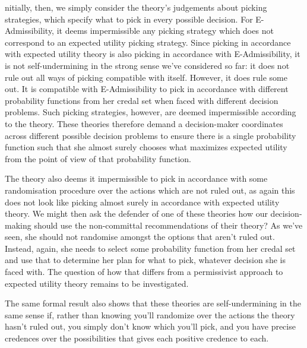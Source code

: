 \documentclass[a4paper]{article}
\renewcommand{\color}[1]{}
\newenvironment{colored}[1]{\leavevmode\color{#1}}{}
\newenvironment{CCM rewritten}
{\begingroup\color{blue}} %
{\endgroup}              %
\begin{document}
\begin{colored}
	Initially, then, we simply consider the theory's judgements about picking strategies, which specify what to pick in every possible decision. 
	For E-Admissibility, it deems impermissible any picking strategy which does not correspond to an expected utility picking strategy. Since picking in accordance with expected utility theory is also picking in accordance with E-Admissibility, it is not self-undermining in the strong sense we've considered so far: it does not rule out all ways of picking compatible with itself. However, it does rule some out.
	 It is compatible with E-Admissibility to pick in accordance with different probability functions from her credal set when faced with different decision problems. 
	 Such picking strategies, however, are deemed impermissible according to the theory.
	 These theories therefore demand a decision-maker coordinates across different possible decision problems to ensure there is a single probability function such that she almost surely chooses what maximizes expected utility from the point of view of that probability function.
	 
	 The theory also deems it impermissible to pick in accordance with some randomisation procedure over the actions which are not ruled out,
	 as again this does not look like picking almost surely in accordance with expected utility theory. 
	 We might then ask the defender of one of these theories how our decision-making should use the non-committal recommendations of their theory? As we've seen, she should not randomise amongst the options that aren't ruled out. Instead, again, she needs to select some probability function from her credal set and use that to determine her plan for what to pick, whatever decision she is faced with. 
	 The question of how that differs from a permissivist approach to expected utility theory remains to be investigated. 
	 
	 The same formal result also shows that these theories are self-undermining in the same sense if, rather than knowing you'll randomize over the actions the theory hasn't ruled out, you simply don't know which you'll pick, and you have precise credences over the possibilities that gives each positive credence to each.%
	 

\end{colored}
\end{document}
